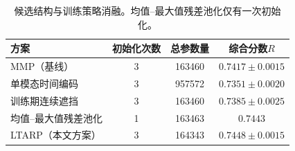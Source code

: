 \begin{table}[H]\centering{}
\caption{候选结构与训练策略消融。均值--最大值残差池化仅有一次初始化。}
\label{tab:q2_ablation}
\begin{tabular}{lccc}
\toprule
方案 & 初始化次数 & 总参数量 & 综合分数$R$\\
\midrule
MMP（基线） & 3 & 163460 & $0.7417\pm0.0015$\\
单模态时间编码 & 3 & 957572 & $0.7351\pm0.0020$\\
训练期连续遮挡 & 3 & 163460 & $0.7385\pm0.0025$\\
均值--最大值残差池化 & 1 & 163463 & $0.7443$\\
LTARP（本文方案） & 3 & 164343 & $0.7448\pm0.0015$\\
\bottomrule
\end{tabular}
\end{table}